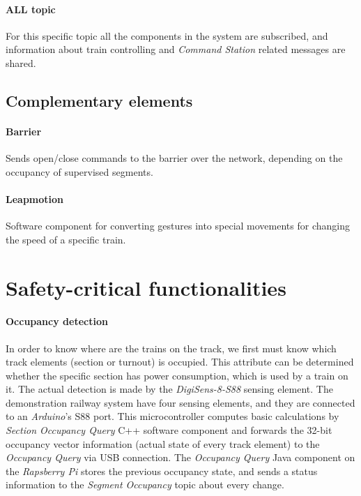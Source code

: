 \paragraph{ALL topic}
For this specific topic all the components in the system are subscribed, and information about train controlling and \textit{Command Station} related messages are shared.

\subsection{Complementary elements}
\paragraph{Barrier} 
Sends open/close commands to the barrier over the network, depending on the occupancy of supervised segments.
\paragraph{Leapmotion}
Software component for converting gestures into special movements for changing the speed of a specific train.

\section{Safety-critical functionalities}\label{section:SC-Functionalities}


\paragraph{Occupancy detection}\label{par:FunctionOccupancyDetection}
In order to know where are the trains on the track, we first must know which track elements (section or turnout) is occupied. This attribute can be determined whether the specific section has power consumption, which is used by a train on it. The actual detection is made by the \textit{DigiSens-8-S88} sensing element. The demonstration railway system have four sensing elements, and they are connected to an \textit{Arduino}'s S88 port. This microcontroller computes basic calculations by \textit{Section Occupancy Query} C++ software component and forwards the 32-bit occupancy vector information (actual state of every track element) to the \textit{Occupancy Query} via USB connection. The \textit{ Occupancy Query} Java component on the \textit{Rapsberry Pi} stores the previous occupancy state, and sends a status information to the \textit{Segment Occupancy} topic about every change.

